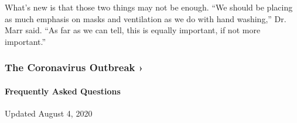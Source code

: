 What's new is that those two things may not be enough. ``We should be
placing as much emphasis on masks and ventilation as we do with hand
washing,'' Dr. Marr said. ``As far as we can tell, this is equally
important, if not more important.''

\href{https://www.nytimes.com/news-event/coronavirus?action=click\&pgtype=Article\&state=default\&region=MAIN_CONTENT_3\&context=storylines_faq}{}

\hypertarget{the-coronavirus-outbreak-}{%
\subsubsection{The Coronavirus Outbreak
›}\label{the-coronavirus-outbreak-}}

\hypertarget{frequently-asked-questions}{%
\paragraph{Frequently Asked
Questions}\label{frequently-asked-questions}}

Updated August 4, 2020

